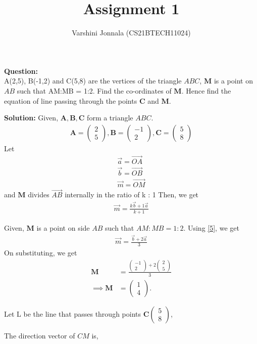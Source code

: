 \documentclass[journal,12pt,twocolumn]{IEEEtran}
\title{Assignment 1}
\author{Varshini Jonnala (CS21BTECH11024)}
\let\vec\mathbf
\newcommand{\myvec}[1]{\ensuremath{\begin{pmatrix}#1\end{pmatrix}}}
\begin{document}
    \maketitle
    \textbf{Question: }\\
      A(2,5), B(-1,2) and C(5,8) are the vertices of the triangle $ABC$, $\vec{M}$ is a point on $AB$ such that AM:MB = 1:2. Find the co-ordinates of $\vec{M}$. Hence find the equation of line passing through the points $\vec{C}$ and $\vec{M}$.


    \textbf{Solution: }
     Given, $\vec{A}, \vec{B}, \vec{C}$ form a triangle $ABC$.
	\begin{align}
		\vec{A} = \myvec{2 \\ 5} ,
		\vec{B} = \myvec{-1 \\ 2},
		\vec{C} = \myvec{5 \\ 8}
	\end{align}
   Let 
    \begin{align}
        \overrightarrow{a} = \overrightarrow{OA}\\
        \overrightarrow{b} = \overrightarrow{OB}\\
        \overrightarrow{m} = \overrightarrow{OM}
    \end{align}
    and $\vec{M}$ divides $\overrightarrow{AB}$ internally in the ratio of k : 1
    Then, we get 
    \begin{align}
       \label{5} \overrightarrow{m}=\frac{k\overrightarrow{b}+1\overrightarrow{a}}{k+1}
    \end{align}

    Given, $\vec{M}$ is a point on side $AB$ such that $AM:MB = 1:2$. 
        Using \eqref{5}, we get
    \begin{align}
        \overrightarrow{m} = \frac{\overrightarrow{b}+2\overrightarrow{a}}{3}
    \end{align}
    On substituting, we get
    \begin{align}
        \vec{M} &= \frac{\myvec{-1 \\ 2} + 2\myvec{2 \\ 5}}{3}\\ \implies \vec{M} &= \myvec{1\\4}.
    \end{align}
    
    Let L be the line that passes through points $\vec{C}\myvec{5\\8}$,
   
    The direction vector of $CM$ is,
    
\end{document}
